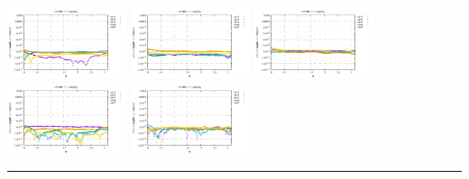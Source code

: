 \noindent
\includegraphics[width=3.5cm]{python_codes/fieldstone_152/RESULTS/exp1_2D/vel_128_m2}
\includegraphics[width=3.5cm]{python_codes/fieldstone_152/RESULTS/exp1_2D/vel_128_m3}
\includegraphics[width=3.5cm]{python_codes/fieldstone_152/RESULTS/exp1_2D/vel_128_m4}
\includegraphics[width=3.5cm]{python_codes/fieldstone_152/RESULTS/exp1_2D/vel_128_m5}
\includegraphics[width=3.5cm]{python_codes/fieldstone_152/RESULTS/exp1_2D/vel_128_m6}

\hrule

